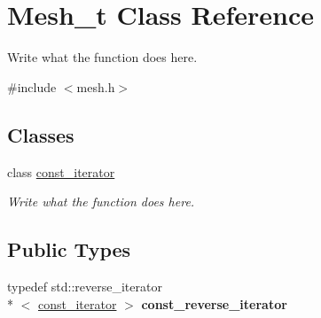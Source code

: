 \hypertarget{classMesh__t}{\section{Mesh\+\_\+t Class Reference}
\label{classMesh__t}
}


Write what the function does here.  




{\ttfamily \#include $<$mesh.\+h$>$}

\subsection*{Classes}
\begin{DoxyCompactItemize}
\item 
class \hyperlink{classMesh__t_1_1const__iterator}{const\+\_\+iterator}
\begin{DoxyCompactList}\small\item\em Write what the function does here. \end{DoxyCompactList}\end{DoxyCompactItemize}
\subsection*{Public Types}
\begin{DoxyCompactItemize}
\item 
\hypertarget{classMesh__t_afa95ea684ae89c95ad46594af23ba960}{typedef std\+::reverse\+\_\+iterator\\*
$<$ \hyperlink{classMesh__t_1_1const__iterator}{const\+\_\+iterator} $>$ {\bfseries const\+\_\+reverse\+\_\+iterator}}\label{classMesh__t_afa95ea684ae89c95ad46594af23ba960}

\end{DoxyCompactItemize}

